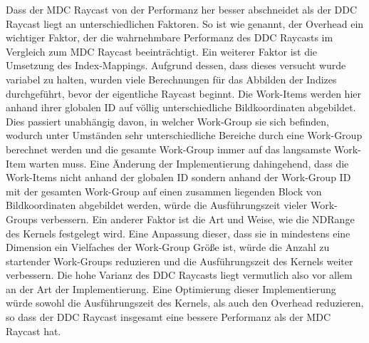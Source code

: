 Dass der MDC Raycast von der Performanz her besser abschneidet als der DDC Raycast liegt an unterschiedlichen Faktoren.
So ist wie genannt, der Overhead ein wichtiger Faktor, der die wahrnehmbare Performanz des DDC Raycasts im Vergleich zum MDC Raycast beeinträchtigt.
Ein weiterer Faktor ist die Umsetzung des Index-Mappings.
Aufgrund dessen, dass dieses versucht wurde variabel zu halten, wurden viele Berechnungen für das Abbilden der Indizes durchgeführt, bevor der eigentliche Raycast beginnt.
Die Work-Items werden hier anhand ihrer globalen ID auf völlig unterschiedliche Bildkoordinaten abgebildet.
Dies passiert unabhängig davon, in welcher Work-Group sie sich befinden, wodurch unter Umständen sehr unterschiedliche Bereiche durch eine Work-Group berechnet werden und die gesamte Work-Group immer auf das langsamste Work-Item warten muss.
Eine Änderung der Implementierung dahingehend, dass die Work-Items nicht anhand der globalen ID sondern anhand der Work-Group ID mit der gesamten Work-Group auf einen zusammen liegenden Block von Bildkoordinaten abgebildet werden, würde die Ausführungszeit vieler Work-Groups verbessern.
Ein anderer Faktor ist die Art und Weise, wie die NDRange des Kernels festgelegt wird.
Eine Anpassung dieser, dass sie in mindestens eine Dimension ein Vielfaches der Work-Group Größe ist, würde die Anzahl zu startender Work-Groups reduzieren und die Ausführungszeit des Kernels weiter verbessern.
Die hohe Varianz des DDC Raycasts liegt vermutlich also vor allem an der Art der Implementierung.
Eine Optimierung dieser Implementierung würde sowohl die Ausführungszeit des Kernels, als auch den Overhead reduzieren, so dass der DDC Raycast insgesamt eine bessere Performanz als der MDC Raycast hat.